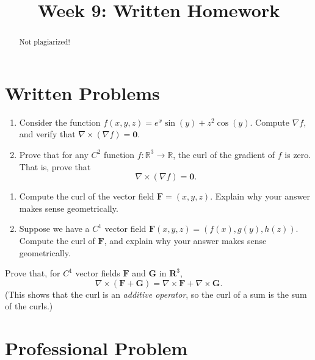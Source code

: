 \documentclass{ximera}
\title{Week 9: Written Homework}
\begin{document}
  
\begin{abstract}  
Not plagiarized!
\end{abstract}  
\maketitle 

\section{Written Problems}

\begin{problem}
\begin{enumerate}
\item Consider the function $f(x,y,z) = e^x\sin(y) + z^2\cos(y)$. Compute $\nabla f$, and verify that $\nabla \times(\nabla f) = \mathbf{0}$.
\item Prove that for any $C^2$ function $f:\mathbb{R}^3\rightarrow\mathbb{R}$, the curl of the gradient of $f$ is zero. That is, prove that
\[
\nabla \times(\nabla f) = \mathbf{0}.
\]
\end{enumerate}
\end{problem}

\begin{problem}
\begin{enumerate}
\item Compute the curl of the vector field $\mathbf{F} = (x,y,z)$. Explain why your answer makes sense geometrically.
\item Suppose we have a $C^1$ vector field $\mathbf{F}(x,y,z) = (f(x), g(y), h(z))$. Compute the curl of $\mathbf{F}$, and explain why your answer makes sense geometrically.
\end{enumerate}
\end{problem}

\begin{problem}
Prove that, for $C^1$ vector fields $\mathbf{F}$ and $\mathbf{G}$ in $\mathbf{R}^3$,
\[
\nabla \times (\mathbf{F}+\mathbf{G}) = \nabla \times \mathbf{F} + \nabla \times \mathbf{G}.
\]
(This shows that the curl is an \emph{additive operator}, so the curl of a sum is the sum of the curls.)
\end{problem}

\section{Professional Problem}
\end{document}
